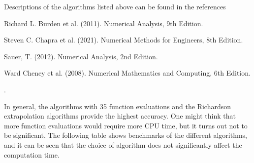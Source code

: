 \documentclass[letterpaper,10pt,english]{sphinxmanual}
\begin{document}
\sphinxAtStartPar
Descriptions of the algorithms listed above can be found in the references %
\begin{footnote}[2]\sphinxAtStartFootnote
Richard L. Burden et al. (2011). Numerical Analysis, 9th Edition.
%
\end{footnote} %
\begin{footnote}[3]\sphinxAtStartFootnote
Steven C. Chapra et al. (2021). Numerical Methods for Engineers, 8th Edition.
%
\end{footnote} %
\begin{footnote}[4]\sphinxAtStartFootnote
Sauer, T. (2012). Numerical Analysis, 2nd Edition.
%
\end{footnote} %
\begin{footnote}[5]\sphinxAtStartFootnote
Ward Cheney et al. (2008). Numerical Mathematics and Computing, 6th Edition.
%
\end{footnote}.

\sphinxAtStartPar
In general, the algorithms with 3\sphinxhyphen{}5 function evaluations and the Richardson extrapolation algorithms provide the highest accuracy. One might think that more function evaluations would require more CPU time, but it turns out not to be significant. The following table shows benchmarks of the different algorithms, and it can be seen that the choice of algorithm does not significantly affect the computation time.
\end{document}
